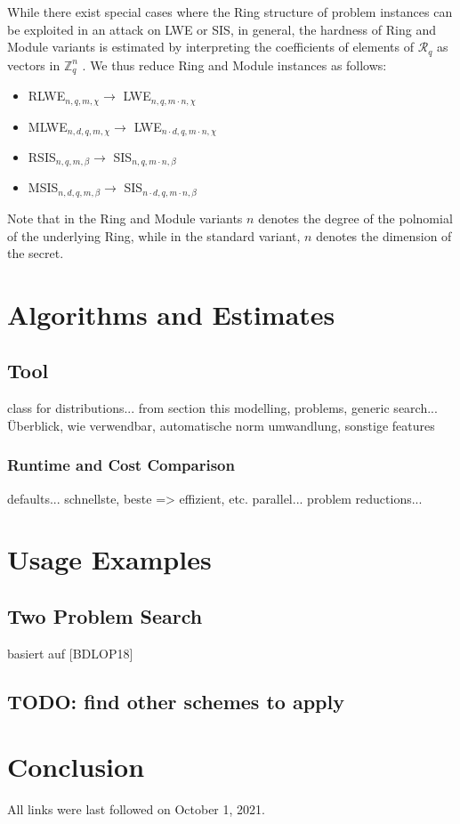 \documentclass[
  a4paper,  %
  twoside,  %
  bibliography=totoc,
  headsepline,
  cleardoublepage=empty,
  parskip=half,
  draft=false
]{scrbook}
\begin{document}
While there exist special cases where the Ring structure of problem instances can be exploited in an attack on LWE or SIS, %
in general, the hardness of Ring and Module variants is estimated by interpreting the coefficients of elements of $\mathcal{R}_q$ as vectors in $\mathbb{Z}_q^n$ \cite{ACDDPPVW18}.
We thus reduce Ring and Module instances as follows:
\begin{itemize}
  \item RLWE$_{n, q, m, \chi} \longrightarrow$ LWE$_{n, q, m \cdot n, \chi}$
  \item MLWE$_{n, d, q, m, \chi} \longrightarrow$ LWE$_{n \cdot d, q, m \cdot n, \chi}$
  \item RSIS$_{n, q, m, \beta} \longrightarrow$ SIS$_{n, q, m \cdot n, \beta}$
  \item MSIS$_{n, d, q, m, \beta} \longrightarrow$ SIS$_{n \cdot d, q, m \cdot n, \beta}$
\end{itemize}
Note that in the Ring and Module variants $n$ denotes the degree of the polnomial of the underlying Ring, %
while in the standard variant, $n$ denotes the dimension of the secret. 
  
  







\chapter{Algorithms and Estimates}



\section{Tool}
class for distributions... from section this modelling, problems, generic search... Überblick, wie verwendbar,
automatische norm umwandlung,
sonstige features

\subsection{Runtime and Cost Comparison}
defaults...
schnellste, beste => effizient, etc. parallel... problem reductions...



\chapter{Usage Examples}
\section{Two Problem Search}
basiert auf [BDLOP18]
\section{TODO: find other schemes to apply}


\chapter{Conclusion}

\printbibliography

All links were last followed on October 1, 2021.


\pagestyle{empty}
\renewcommand*{\chapterpagestyle}{empty}
\Versicherung
\end{document}

